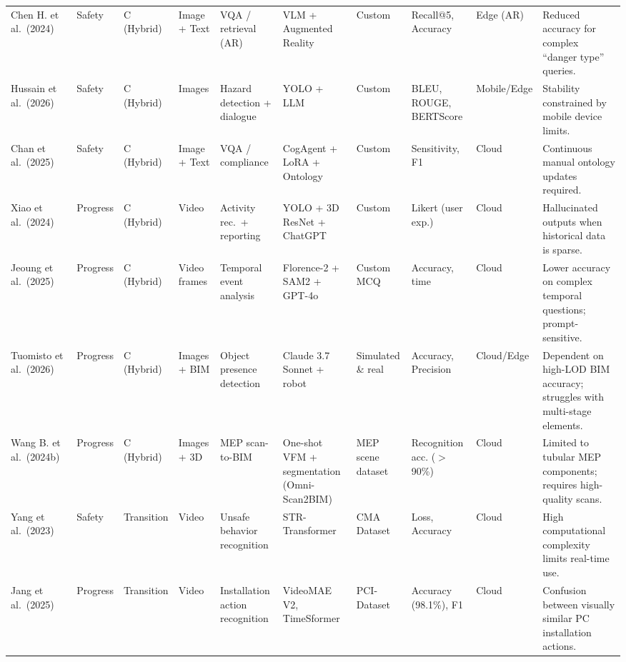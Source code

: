 \documentclass[10pt,letterpaper]{article}
\begin{document}
\begin{landscape}
\begin{longtable}{L{2.8cm} L{1.7cm} L{2.0cm} L{2.5cm} L{1.5cm} L{3.0cm} L{1.8cm} L{2.0cm} L{2.0cm} L{3.2cm}}
Chen H. et al.\ (2024) & Safety & C (Hybrid) & Image + Text & VQA / retrieval (AR) & VLM + Augmented Reality & Custom & Recall@5, Accuracy & Edge (AR) & Reduced accuracy for complex ``danger type'' queries.\\

Hussain et al.\ (2026) & Safety & C (Hybrid) & Images & Hazard detection + dialogue & YOLO + LLM & Custom & BLEU, ROUGE, BERTScore & Mobile/Edge & Stability constrained by mobile device limits.\\

Chan et al.\ (2025) & Safety & C (Hybrid) & Image + Text & VQA / compliance & CogAgent + LoRA + Ontology & Custom & Sensitivity, F1 & Cloud & Continuous manual ontology updates required.\\

Xiao et al.\ (2024)~\cite{xiao2024} & Progress & C (Hybrid) & Video & Activity rec.\ + reporting & YOLO + 3D ResNet + ChatGPT & Custom & Likert (user exp.) & Cloud & Hallucinated outputs when historical data is sparse.\\

Jeoung et al.\ (2025) & Progress & C (Hybrid) & Video frames & Temporal event analysis & Florence-2 + SAM2 + GPT-4o & Custom MCQ & Accuracy, time & Cloud & Lower accuracy on complex temporal questions; prompt-sensitive.\\

Tuomisto et al.\ (2026) & Progress & C (Hybrid) & Images + BIM & Object presence detection & Claude 3.7 Sonnet + robot & Simulated \& real & Accuracy, Precision & Cloud/Edge & Dependent on high-LOD BIM accuracy; struggles with multi-stage elements.\\

Wang B. et al.\ (2024b)~\cite{wangb2024} & Progress & C (Hybrid) & Images + 3D & MEP scan-to-BIM & One-shot VFM + segmentation (Omni-Scan2BIM) & MEP scene dataset & Recognition acc. ($>$90\%) & Cloud & Limited to tubular MEP components; requires high-quality scans.\\

Yang et al.\ (2023)~\cite{yang2023} & Safety & Transition & Video & Unsafe behavior recognition & STR-Transformer & CMA Dataset & Loss, Accuracy & Cloud & High computational complexity limits real-time use.\\

Jang et al.\ (2025)~\cite{jang2025} & Progress & Transition & Video & Installation action recognition & VideoMAE V2, TimeSformer & PCI-Dataset & Accuracy (98.1\%), F1 & Cloud & Confusion between visually similar PC installation actions.\\


\end{longtable}
\end{landscape}
\end{document}
